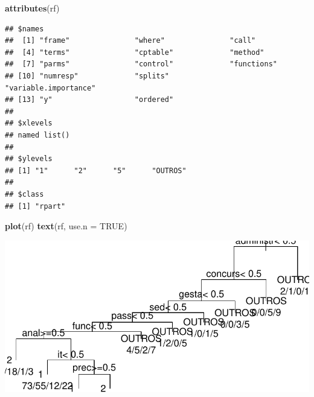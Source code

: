 \documentclass[]{article}
\newenvironment{Shaded}{\begin{snugshade}}{\end{snugshade}}
\newcommand{\CommentTok}[1]{\textcolor[rgb]{0.56,0.35,0.01}{\textit{#1}}}
\newcommand{\DataTypeTok}[1]{\textcolor[rgb]{0.13,0.29,0.53}{#1}}
\newcommand{\KeywordTok}[1]{\textcolor[rgb]{0.13,0.29,0.53}{\textbf{#1}}}
\newcommand{\NormalTok}[1]{#1}
\newcommand{\OperatorTok}[1]{\textcolor[rgb]{0.81,0.36,0.00}{\textbf{#1}}}
\newcommand{\OtherTok}[1]{\textcolor[rgb]{0.56,0.35,0.01}{#1}}
\newcommand{\StringTok}[1]{\textcolor[rgb]{0.31,0.60,0.02}{#1}}
\begin{document}
\begin{Shaded}
\begin{Highlighting}[]
\KeywordTok{attributes}\NormalTok{(rf)}
\end{Highlighting}
\end{Shaded}

\begin{verbatim}
## $names
##  [1] "frame"               "where"               "call"               
##  [4] "terms"               "cptable"             "method"             
##  [7] "parms"               "control"             "functions"          
## [10] "numresp"             "splits"              "variable.importance"
## [13] "y"                   "ordered"            
## 
## $xlevels
## named list()
## 
## $ylevels
## [1] "1"      "2"      "5"      "OUTROS"
## 
## $class
## [1] "rpart"
\end{verbatim}

\begin{Shaded}
\begin{Highlighting}[]
\KeywordTok{plot}\NormalTok{(rf)}
\KeywordTok{text}\NormalTok{(rf, }\DataTypeTok{use.n =} \OtherTok{TRUE}\NormalTok{)}
\end{Highlighting}
\end{Shaded}

\includegraphics{markdown_v50_files/figure-latex/unnamed-chunk-85-1.pdf}

\begin{Shaded}
\end{Shaded}
\end{document}
